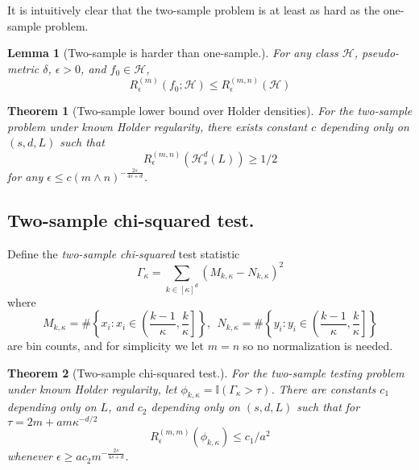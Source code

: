 \documentclass{article}
\newcommand{\set}[1]{\left\{#1\right\}}
\newcommand{\1}{\mathbb{I}}
\newcommand{\Hclass}{\mathcal{H}}
\theoremstyle{alden}
\theoremstyle{aldenthm}
\newtheorem{theorem}{Theorem}
\newtheorem{lemma}{Lemma}
\theoremstyle{definition}
\theoremstyle{remark}
\begin{document}
It is intuitively clear that the two-sample problem is at least as hard as the one-sample problem.

\begin{lemma}[Two-sample is harder than one-sample.]
	\label{lem: two_sample_harder_one_sample}
	For any class $\Hclass$, pseudo-metric $\delta$, $\epsilon > 0$, and $f_0 \in \Hclass$,
	\begin{equation*}
	R_{\epsilon}^{(m)}(f_0; \Hclass) \leq R_{\epsilon}^{(m,n)}(\Hclass)
	\end{equation*}
\end{lemma}

\begin{theorem}[Two-sample lower bound over Holder densities]
	\label{thm: two_sample_Holder_lower_bound}
	For the two-sample problem under known Holder regularity, there exists constant $c$ depending only on $(s,d,L)$ such that
	\begin{equation*}
	R_{\epsilon}^{(m,n)}(\Hclass_s^d(L)) \geq 1/2
	\end{equation*}
	for any $\epsilon \leq c(m \wedge n)^{-\frac{2s}{4s + d}}$. 
\end{theorem}

\subsection{Two-sample chi-squared test.}
Define the \emph{two-sample chi-squared} test statistic
\begin{equation*}
\Gamma_{\kappa} = \sum_{k \in [\kappa]^d} (M_{k, \kappa} - N_{k, \kappa})^2
\end{equation*}
where
\begin{equation*}
M_{k,\kappa} = \# \set{x_i: x_i \in \left(\frac{k-1}{\kappa}, \frac{k}{\kappa}\right]},~~ N_{k,\kappa} = \# \set{y_i: y_i \in \left(\frac{k-1}{\kappa}, \frac{k}{\kappa}\right]}
\end{equation*}
are bin counts, and for simplicity we let $m = n$ so no normalization is needed.

\begin{theorem}[Two-sample chi-squared test.]
	\label{thm: two_sample_chi_squared_test}
	For the two-sample testing problem under known Holder regularity, let $\phi_{k, \kappa} = \mathbb{I}(\Gamma_{\kappa} > \tau)$. There are constants $c_1$ depending only on $L$, and $c_2$ depending only on $(s,d,L)$ such that for $\tau = 2m + a m \kappa^{-d/2}$
	\begin{equation*}
	R_{\epsilon}^{(m,m)}(\phi_{k, \kappa}) \leq c_1/a^2
	\end{equation*}
	whenever $\epsilon \geq a c_2 m^{-\frac{2s}{4s + d}}$. 
\end{theorem}
\end{document}
